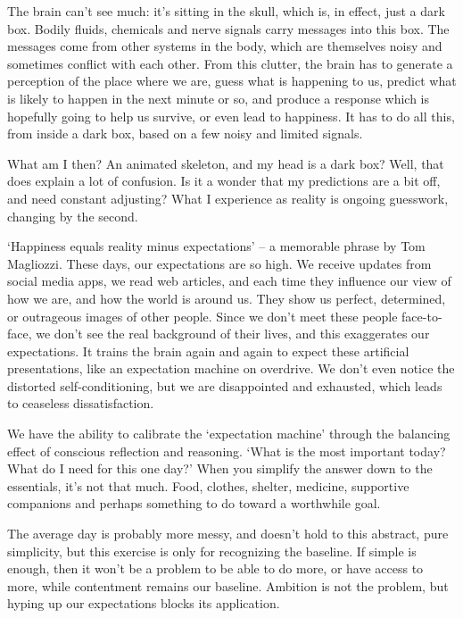 The brain can't see much: it's sitting in the skull, which is, in
effect, just a dark box. Bodily fluids, chemicals and nerve signals
carry messages into this box. The messages come from other systems in
the body, which are themselves noisy and sometimes conflict with each
other. From this clutter, the brain has to generate a perception of the
place where we are, guess what is happening to us, predict what is
likely to happen in the next minute or so, and produce a response which
is hopefully going to help us survive, or even lead to happiness. It has
to do all this, from inside a dark box, based on a few noisy and limited
signals.

What am I then? An animated skeleton, and my head is a dark box? Well,
that does explain a lot of confusion. Is it a wonder that my predictions
are a bit off, and need constant adjusting? What I experience as reality
is ongoing guesswork, changing by the second.

\clearpage

`Happiness equals reality minus expectations' -- a memorable phrase by
Tom Magliozzi. These days, our expectations are so high. We receive
updates from social media apps, we read web articles, and each time they
influence our view of how we are, and how the world is around us. They
show us perfect, determined, or outrageous images of other people. Since
we don't meet these people face-to-face, we don't see the real
background of their lives, and this exaggerates our expectations. It
trains the brain again and again to expect these artificial
presentations, like an expectation machine on overdrive. We don't even
notice the distorted self-conditioning, but we are disappointed and
exhausted, which leads to ceaseless dissatisfaction.


We have the ability to calibrate the `expectation machine' through the
balancing effect of conscious reflection and reasoning. `What is the
most important today? What do I need for this one day?' When you
simplify the answer down to the essentials, it's not that much. Food,
clothes, shelter, medicine, supportive companions and perhaps something
to do toward a worthwhile goal.

The average day is probably more messy, and doesn't hold to this
abstract, pure simplicity, but this exercise is only for recognizing the
baseline. If simple is enough, then it won't be a problem to be able to
do more, or have access to more, while contentment remains our baseline.
Ambition is not the problem, but hyping up our expectations blocks its
application.

